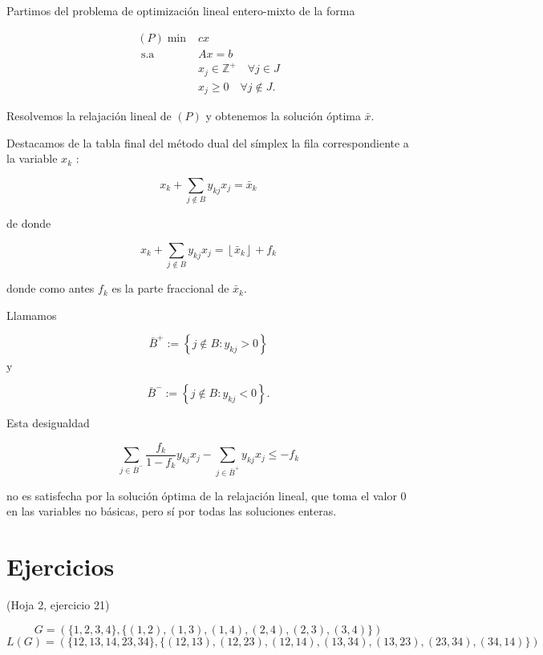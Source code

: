 \documentclass[openany]{book}
\begin{document}
Partimos del problema de optimización lineal entero-mixto de la forma

$$
\begin{aligned}
(P) \min & c x \\
\text { s.a } & A x=b \\
& x_{j} \in \mathbb{Z}^{+} \quad \forall j \in J \\
& x_{j} \geq 0 \quad \forall j \notin J .
\end{aligned}
$$

Resolvemos la relajación lineal de $(P)$ y obtenemos la solución óptima $\bar{x}$.

Destacamos de la tabla final del método dual del símplex la fila correspondiente a la variable $x_{k}$ :

$$
x_{k}+\sum_{j \notin B} y_{k j} x_{j}=\bar{x}_{k}
$$

de donde

$$
x_{k}+\sum_{j \notin B} y_{k j} x_{j}=\left\lfloor\bar{x}_{k}\right\rfloor+f_{k}
$$

donde como antes $f_{k}$ es la parte fraccional de $\bar{x}_{k}$.

Llamamos

$$
\bar{B}^{+}:=\left\{j \notin B: y_{k j}>0\right\}
$$

$\mathrm{y}$

$$
\bar{B}^{-}:=\left\{j \notin B: y_{k j}<0\right\} .
$$

Esta desigualdad

$$
\sum_{j \in \bar{B}^{-}} \frac{f_{k}}{1-f_{k}} y_{k j} x_{j}-\sum_{j \in \bar{B}^{+}} y_{k j} x_{j} \leq-f_{k}
$$

no es satisfecha por la solución óptima de la relajación lineal, que toma el valor 0 en las variables no básicas, pero sí por todas las soluciones enteras.






\chapter{Ejercicios}

\begin{exercise}
  (Hoja 2, ejercicio 21)
\end{exercise}

$$ G = (\{ 1,2,3,4 \}, \{ (1,2), (1,3), (1,4), (2,4), (2,3), (3,4) \}) $$
$$ L(G)= (\{ 12, 13, 14, 23, 34 \}, \{ (12, 13), (12, 23), (12,14), (13,34), (13,23), (23, 34), (34, 14) \}) $$
\end{document}
